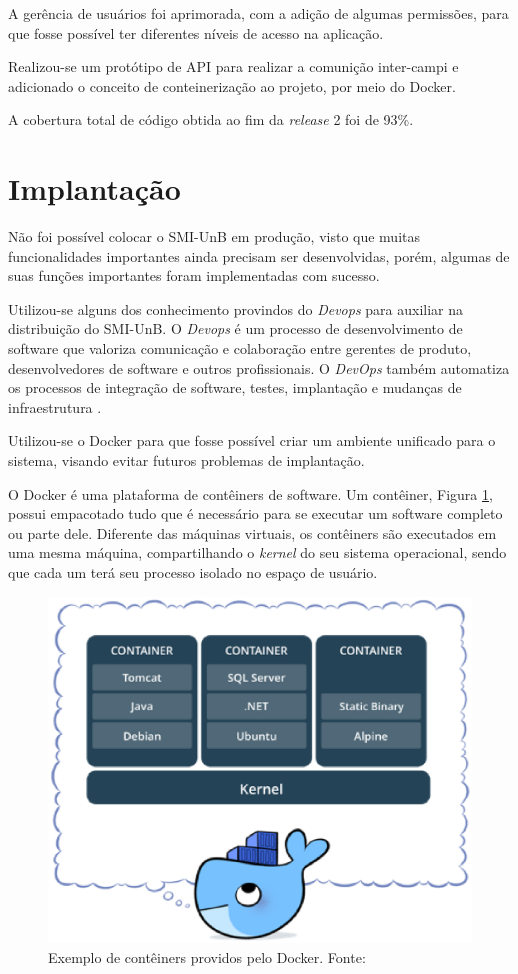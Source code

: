A gerência de usuários foi aprimorada, com a adição de algumas permissões, para que fosse possível ter diferentes níveis de acesso na aplicação.

Realizou-se um protótipo de API para realizar a comunição inter-campi e adicionado o conceito de conteinerização ao projeto, por meio do Docker.

A cobertura total de código obtida ao fim da \textit{release} 2 foi de 93\%.

\section{Implantação}
Não foi possível colocar o SMI-UnB em produção, visto que muitas funcionalidades importantes ainda precisam ser desenvolvidas, porém, algumas de suas funções importantes foram implementadas com sucesso.

Utilizou-se alguns dos conhecimento provindos do \textit{Devops} para auxiliar na distribuição do SMI-UnB. O \textit{Devops} é um processo de desenvolvimento de software que valoriza comunicação e colaboração entre gerentes de produto, desenvolvedores de software e outros profissionais. O \textit{DevOps} também automatiza os processos de integração de software, testes, implantação e mudanças de infraestrutura \cite{loukides_2012}.

Utilizou-se o Docker \cite{docker} para que fosse possível criar um ambiente unificado para o sistema, visando evitar futuros problemas de implantação.

O Docker é uma plataforma de contêiners de software. Um contêiner, Figura \ref{container}, possui empacotado tudo que é necessário para se executar um software completo ou parte dele. Diferente das máquinas virtuais, os contêiners são executados em uma mesma máquina, compartilhando o \textit{kernel} do seu sistema operacional, sendo que cada um terá seu processo isolado no espaço de usuário.

\begin{figure}[!h]
    \centering
    \includegraphics[keepaspectratio=true,scale=0.8]{figuras/container.eps}
    \caption{Exemplo de contêiners providos pelo Docker. Fonte: \cite{docker} }
    \label{container}
\end{figure}

